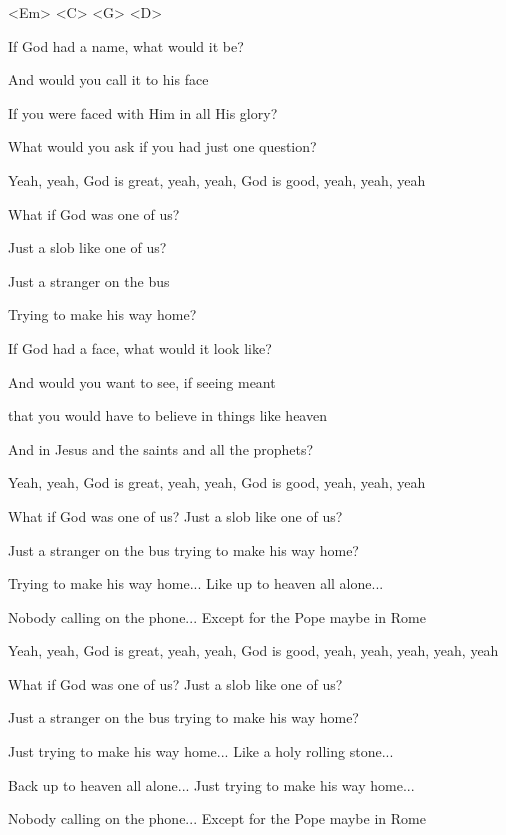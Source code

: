 

<Em> <C> <G> <D>

\zs
If God had a name, what would it be?

And would you call it to his face

If you were faced with Him in all His glory?

What would you ask if you had just one question?

Yeah, yeah, God is great, yeah, yeah, God is good, yeah, yeah, yeah
\ks

\zr
What if God was one of us?

Just a slob like one of us?

Just a stranger on the bus

Trying to make his way home?
\kr

\zs
If God had a face, what would it look like?

And would you want to see, if seeing meant

that you would have to believe in things like heaven

And in Jesus and the saints and all the prophets?

Yeah, yeah, God is great, yeah, yeah, God is good, yeah, yeah, yeah
\ks

\zr
What if God was one of us?  Just a slob like one of us?

Just a stranger on the bus trying to make his way home?

Trying to make his way home...  Like up to heaven all alone...

Nobody calling on the phone...  Except for the Pope maybe in Rome

Yeah, yeah, God is great, yeah, yeah, God is good, yeah, yeah, yeah, yeah, yeah
\kr

\zr
What if God was one of us?  Just a slob like one of us?

Just a stranger on the bus trying to make his way home?

Just trying to make his way home...
Like a holy rolling stone...

Back up to heaven all alone...
Just trying to make his way home...

Nobody calling on the phone...
Except for the Pope maybe in Rome
\kr

\kp
